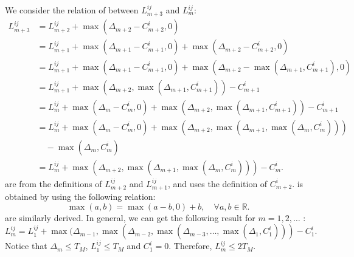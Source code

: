 	We consider the relation of between $L^{ij}_{m+3}$ and $L^{ij}_{m}$:
	\small
	\begin{subequations}
		\begin{align}
		L^{ij}_{m+3}&=L^{ij}_{m+2}+\max(\Delta_{m+2}-C^i_{m+2},0)\label{subeq:app1}\\
		&=L^{ij}_{m+1}+\max(\Delta_{m+1}-C^i_{m+1},0)+\max(\Delta_{m+2}-C^i_{m+2},0)\label{subeq:app2}\\
		&=L^{ij}_{m+1}+\max(\Delta_{m+1}-C^i_{m+1},0)+\max(\Delta_{m+2}-\max(\Delta_{m+1},C^i_{m+1}),0)\label{subeq:app3}\\
		&=L^{ij}_{m+1}+\max(\Delta_{m+2},\max(\Delta_{m+1},C^i_{m+1}))-C^i_{m+1}\label{subeq:app4}\\
		&=L^{ij}_{m}+\max(\Delta_{m}-C^i_{m},0)+\max(\Delta_{m+2},\max(\Delta_{m+1},C^i_{m+1}))-C^i_{m+1}\label{subeq:app5}\\
		&=L^{ij}_{m}+\max(\Delta_{m}-C^i_{m},0)+\max(\Delta_{m+2},\max(\Delta_{m+1},\max(\Delta_{m},C^i_{m})))\nonumber\\
		&\quad -\max(\Delta_{m},C^i_{m})\label{subeq:app6}\\
		&=L^{ij}_{m}+\max(\Delta_{m+2},\max(\Delta_{m+1},\max(\Delta_{m},C^i_{m})))-C^i_{m}\label{subeq:app7}.
		\end{align}
	\end{subequations}
	\normalsize
	 are from the definitions of $L^{ij}_{m+2}$ and $L^{ij}_{m+1}$, and  uses the definition of $C^i_{m+2}$.
	 is obtained by using the following relation:
	\begin{equation*}
		\max(a,b)=\max(a-b,0)+b,\quad \forall a,b\in\mathbb{R}.
	\end{equation*}
	 are similarly derived.
	In general, we can get the following result for $m=1,2,\dots$ :
	\begin{equation*}
		L^{ij}_{m}=L^{ij}_{1}+\max(\Delta_{m-1},\max(\Delta_{m-2},\max(\Delta_{m-3},\dots,\max(\Delta_1,C^i_1)))-C^i_1.
	\end{equation*}
	Notice that $\Delta_{m}\le T_M$, $L^{ij}_{1}\le T_M$ and $C^i_1=0$.
	Therefore, $L^{ij}_{m}\le 2T_M$.
	
	
\appendix